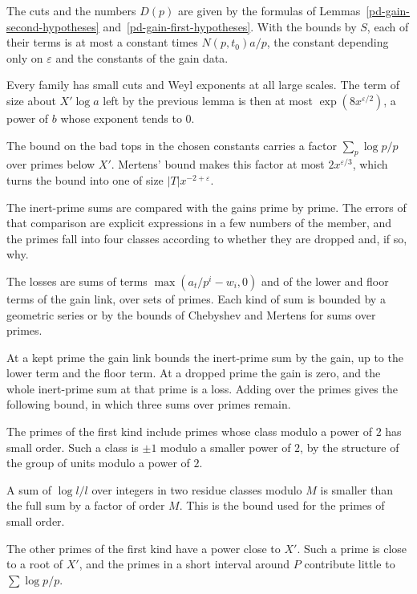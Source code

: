 The cuts and the numbers $D(p)$ are given by the formulas of
Lemmas~\ref{pd-gain-second-hypotheses} and~\ref{pd-gain-first-hypotheses}.
With the bounds by $S$, each of their terms is at most a constant times
$N(p,t_0)a/p$, the constant depending only on $\varepsilon$ and the constants
of the gain data.

Every family has small cuts and Weyl exponents at all large scales. The term of
size about $X'\log a$ left by the previous lemma is then at most
$\exp(8x^{\varepsilon/2})$, a power of $b$ whose exponent tends to $0$.

The bound on the bad tops in the chosen constants carries a factor
$\sum_p\log p/p$ over primes below $X'$. Mertens' bound makes this factor at
most $2x^{\varepsilon/3}$, which turns the bound into one of size
$|T|x^{-2+\varepsilon}$.

The inert-prime sums are compared with the gains prime by prime. The errors of
that comparison are explicit expressions in a few numbers of the member, and
the primes fall into four classes according to whether they are dropped and,
if so, why.

The losses are sums of terms $\max(a_t/p^i-w_i,0)$ and of the lower and floor
terms of the gain link, over sets of primes. Each kind of sum is bounded by a
geometric series or by the bounds of Chebyshev and Mertens for sums over
primes.

At a kept prime the gain link bounds the inert-prime sum by the gain, up to the
lower term and the floor term. At a dropped prime the gain is zero, and the
whole inert-prime sum at that prime is a loss. Adding over the primes gives the
following bound, in which three sums over primes remain.

The primes of the first kind include primes whose class modulo a power of $2$
has small order. Such a class is $\pm1$ modulo a smaller power of $2$, by the
structure of the group of units modulo a power of $2$.

A sum of $\log l/l$ over integers in two residue classes modulo $M$ is smaller
than the full sum by a factor of order $M$. This is the bound used for the
primes of small order.

The other primes of the first kind have a power close to $X'$. Such a prime is
close to a root of $X'$, and the primes in a short interval around $P$
contribute little to $\sum\log p/p$.

